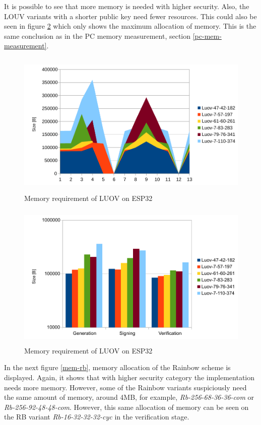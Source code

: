 \documentclass[thesis=M,english]{FITthesis}[2019/12/23]
\begin{document}
\bigskip
\noindent
It is possible to see that more memory is needed with higher security. Also, the LOUV variants with a shorter public key need fewer resources. This could also be seen in figure \ref{mem-luov} which only shows the maximum allocation of memory. This is the same conclusion as in the PC memory measurement, section \ref{pc-mem-measurement}.

\bigskip\bigskip
\begin{figure}[H]
\centering
\includegraphics[width=13cm,height=7cm]{images/mem-luov0.pdf}
\caption{Memory requirement of LUOV on ESP32}
\label{mem-luov0}
\end{figure}

\bigskip\bigskip\bigskip
\begin{figure}[H]
\centering
\includegraphics[width=13cm,height=7cm]{images/mem-luov.pdf}
\caption{Memory requirement of LUOV on ESP32}
\label{mem-luov}
\end{figure}

\newpage
\noindent
In the next figure \ref{mem-rb}, memory allocation of the Rainbow scheme is displayed. Again, it shows that with higher security category the implementation needs more memory. However, some of the Rainbow variants suspiciously need the same amount of memory, around 4MB, for example, \textit{Rb-256-68-36-36-com} or \textit{Rb-256-92-48-48-com}. However, this same allocation of memory can be seen on the RB variant \textit{Rb-16-32-32-32-cyc} in the verification stage.
\end{document}
